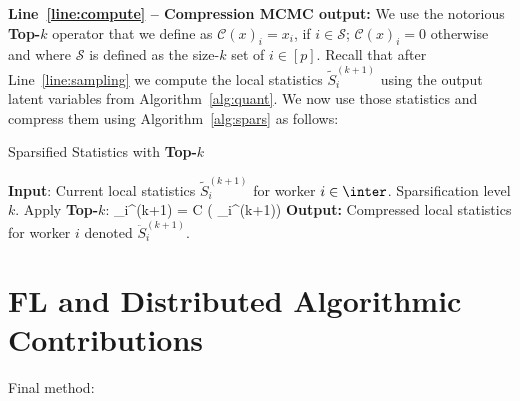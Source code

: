 \documentclass[11pt]{article}
\theoremstyle{t}
\begin{document}
\noindent \textbf{Line~\ref{line:compute} -- Compression MCMC output:}
We use the notorious \textbf{Top-$k$} operator that we define as $\mathcal C(x)_i=x_i$, if $i\in \mathcal S$; $\mathcal C(x)_i=0$ otherwise and where $\mathcal S$ is defined as the size-$k$ set of $i\in[p]$.
Recall that after Line~\ref{line:sampling} we compute the local statistics $\tilde{S}_{i}^{(k+1)}$ using the output latent variables from Algorithm~\ref{alg:quant}.
We now use those statistics and compress them using Algorithm~\ref{alg:spars} as follows:

\begin{algorithm}[H]
\caption{Sparsified Statistics with \textbf{Top-$k$}} \label{alg:spars}
\begin{algorithmic}[1]
\STATE \textbf{Input}: Current local statistics $\tilde{S}_{i}^{(k+1)}$ for worker $i \in \inter$. Sparsification level $k$.
\STATE Apply \textbf{Top-$k$}:
\beq\label{eq:topkstats}
_{i}^{(k+1)} = \mathcal C \left( _{i}^{(k+1)}\right)
\eeq
\STATE \textbf{Output:} Compressed local statistics for worker $i$ denoted $\ddot{S}_{i}^{(k+1)}$.
\end{algorithmic}
\end{algorithm}


\section{FL and Distributed Algorithmic Contributions}
Final method:
\end{document}
